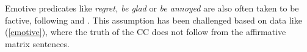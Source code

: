 \documentclass[11pt,fleqn]{article}
\def\infelic{{\leavevmode\llap{\#}}}
\newcommand{\6}{\mbox{$[\hspace*{-.6mm}[$}}
\newcommand{\9}{\mbox{$]\hspace*{-.6mm}]$}}
\begin{document}
%
%
%
%
%
%

%
%
%
%
%





%

Emotive predicates like {\em regret, be glad} or {\em be annoyed} are also often taken to be factive, following \citealt{kiparsky-kiparsky70} and \citealt{karttunen71b}. This assumption has been challenged based on data like (\ref{emotive}), where the truth of the CC does not follow from the affirmative matrix sentences. 
\end{document}
